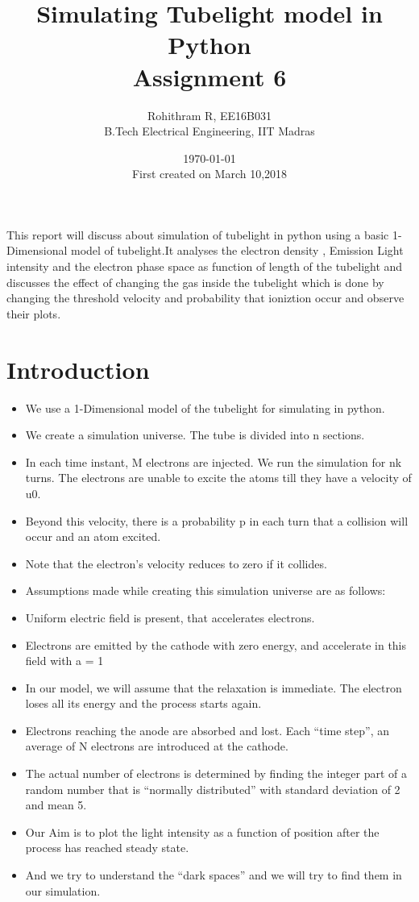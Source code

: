 \documentclass[10pt,a4paper]{article}
\title{Simulating Tubelight model in Python \\ Assignment 6}
\author{Rohithram R, EE16B031 \\ B.Tech Electrical Engineering, IIT Madras}
\date{\today \\ First created on March 10,2018}
\providecommand{\tightlist}{%
      \setlength{\itemsep}{0pt}\setlength{\parskip}{0pt}}
\begin{document}
    
    
    \maketitle
    
    

    
    \begin{abstract}
    \end{abstract}

 This report will discuss about simulation of tubelight in python using
a basic 1-Dimensional model of tubelight.It analyses the electron
density , Emission Light intensity and the electron phase space as
function of length of the tubelight and discusses the effect of changing
the gas inside the tubelight which is done by changing the threshold
velocity and probability that ioniztion occur and observe their plots.

    \section{Introduction}\label{introduction}



\begin{itemize}
\tightlist
\item
  We use a 1-Dimensional model of the tubelight for simulating in
  python.
\item
  We create a simulation universe. The tube is divided into n sections.
\item
  In each time instant, M electrons are injected. We run the simulation
  for nk turns. The electrons are unable to excite the atoms till they
  have a velocity of u0.
\item
  Beyond this velocity, there is a probability p in each turn that a
  collision will occur and an atom excited.
\item
  Note that the electron's velocity reduces to zero if it collides.
\item
  Assumptions made while creating this simulation universe are as
  follows:
\item
  Uniform electric field is present, that accelerates electrons.
\item
  Electrons are emitted by the cathode with zero energy, and accelerate
  in this field with a = 1
\item
  In our model, we will assume that the relaxation is immediate. The
  electron loses all its energy and the process starts again.
\item
  Electrons reaching the anode are absorbed and lost. Each ``time
  step'', an average of N electrons are introduced at the cathode.
\item
  The actual number of electrons is determined by finding the integer
  part of a random number that is ``normally distributed'' with standard
  deviation of 2 and mean 5.
\item
  Our Aim is to plot the light intensity as a function of position after
  the process has reached steady state.
\item
  And we try to understand the ``dark spaces'' and we will try to find
  them in our simulation.
\end{itemize}
\end{document}
